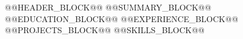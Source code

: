 \documentclass[10pt]{article}
\begin{document}
@@HEADER_BLOCK@@
@@SUMMARY_BLOCK@@
@@EDUCATION_BLOCK@@
@@EXPERIENCE_BLOCK@@
@@PROJECTS_BLOCK@@
@@SKILLS_BLOCK@@
\end{document}
